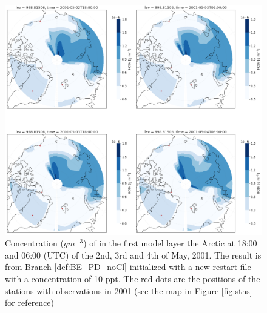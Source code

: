\begin{figure}[h]
    \centering
    \includegraphics[width=\linewidth]{Chapter6_Results/images/Polar_StationComp_2001/HOBr/polarHOBr_newRestart.png}
    \caption{Concentration ($g m^{-3}$) of  in the first model layer the Arctic at 18:00 and 06:00 (UTC) of the 2nd, 3rd and 4th of May, 2001. The result is from Branch \ref{def:BE_PD_noCl} initialized with a new restart file with a  concentration of 10 ppt. The red dots are the positions of the stations with observations in 2001 (see the map in Figure \ref{fig:stns} for reference)}
    \label{fig:polarHOBr_newRestart}
\end{figure}